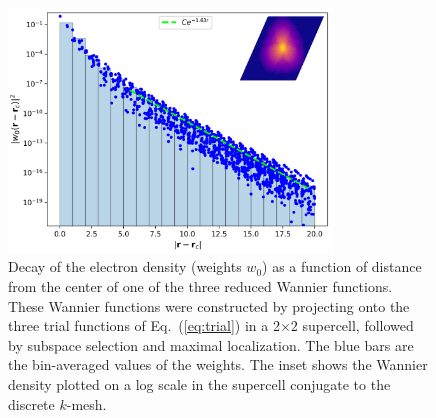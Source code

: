 \documentclass[galley,aps,pra,10pt,amsmath,amssymb,
    superscriptaddress,nofootinbib,longbibliography]{revtex4-2}
\newcounter{comm}
\newcommand{\eq}[1]{Eq.~(\ref{eq:#1})}
\begin{document}
\begin{figure}[b]
\begin{center}
\includegraphics[width=3.4in]{fig3.png}
\end{center}
\vspace{-5mm}
\caption{Decay of the electron density (weights $w_0$) as a function of distance from the center of one of the three reduced Wannier functions. These Wannier functions were constructed by projecting onto the three trial functions of \eq{trial} in a 2$\times 2$ supercell, followed by subspace selection and maximal localization. The blue bars are the bin-averaged values of the weights. The inset shows the Wannier density plotted on a log scale in the supercell conjugate to the discrete $k$-mesh.}
\label{FIG3}
\end{figure}
\end{document}
